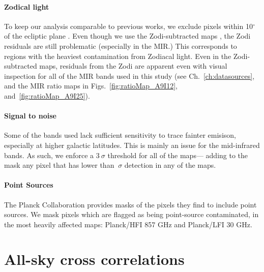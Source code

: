       \paragraph{Zodical light}
        To keep our analysis comparable to previous works, we exclude pixels within 10$^{\circ}$ of the ecliptic plane \citep{hensley16}.  Even though we use the Zodi-subtracted maps \citep{kelsall98, kondo16, ootsubo16}, the Zodi residuals are still problematic (especially in the MIR.) This corresponds to regions with the heaviest contamination from Zodiacal light. Even in the Zodi-subtracted maps, residuals from the Zodi are apparent even with visual inspection for all of the MIR bands used in this study (see Ch.~\ref{ch:datasources}, and the MIR ratio maps in Figs.~\ref{fig:ratioMap_A9I12}, and~\ref{fig:ratioMap_A9I25}).

      \paragraph{Signal to noise}
        Some of the bands used lack sufficient sensitivity to trace fainter emisison, especially at higher galactic latitudes. This is mainly an issue for the mid-infrared bands. As such, we enforce a $3~\sigma$ threshold for all of the maps--- adding to the mask any pixel that has lower than $~\sigma$ detection in any of the maps.

     \paragraph{Point Sources}
       The Planck Collaboration provides masks of the pixels they find to include point sources. We mask pixels which are flagged as being point-source contaminated, in the most heavily affected maps: Planck/HFI 857 GHz and Planck/LFI 30 GHz.

  \section{All-sky cross correlations}

